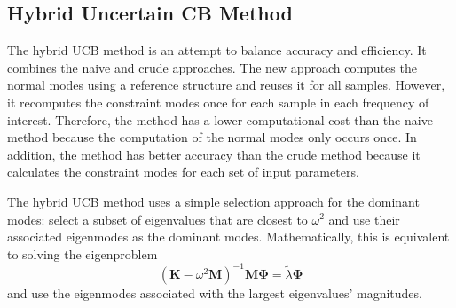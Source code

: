 %
%

\subsection{Hybrid Uncertain CB Method}
\label{ssec: HUCB}

The hybrid UCB method is an attempt to balance accuracy and efficiency.
It combines the naive and crude approaches.
The new approach computes the normal modes using a reference structure and reuses it for all samples.
However, it recomputes the constraint modes once for each sample in each frequency of interest.
Therefore, the method has a lower computational cost than the naive method because the computation of the normal modes only occurs once.
In addition, the method has better accuracy than the crude method because it calculates the constraint modes for each set of input parameters.

The hybrid UCB method uses a simple selection approach for the dominant modes: select a subset of eigenvalues that are closest to $\omega^{2}$ and use their associated eigenmodes as the dominant modes.
Mathematically, this is equivalent to solving the eigenproblem
\begin{equation}
    \left(
        \mathbf{K} - \omega^{2} \mathbf{M}
    \right)^{-1}
    \mathbf{M}
    \mathbf{\Phi}
    =
    \tilde{\lambda}
    \mathbf{\Phi}
\end{equation}
and use the eigenmodes associated with the largest eigenvalues' magnitudes.

